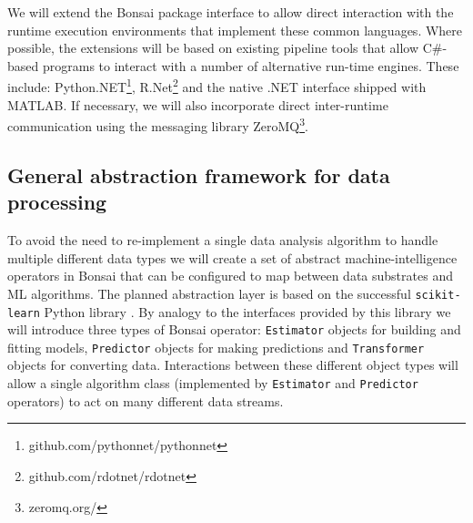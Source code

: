 We will extend the Bonsai package interface to allow direct interaction with the runtime execution environments that implement these common languages.  
%
Where possible, the extensions will be based on existing pipeline tools that allow C\#-based programs to interact with a number of alternative run-time engines.
%
These include:
%
Python.NET\footnote{github.com/pythonnet/pythonnet},
%
R.Net\break \footnote{github.com/rdotnet/rdotnet}
%
and the native .NET interface shipped with MATLAB.
%
If necessary, we will also incorporate direct inter-runtime communication using the messaging library ZeroMQ\footnote{zeromq.org/}.\\

\subsection{General abstraction framework for data processing}
\label{sec:generality}

To avoid the need to re-implement a single data analysis algorithm to handle multiple different data types we will create a set of abstract machine-intelligence operators in Bonsai that can be configured to map between data substrates and ML algorithms.
%
The planned abstraction layer is based on the successful \texttt{scikit-learn} Python
library \citep{buitinckEtAl13}.
%
By analogy to the interfaces provided by this library we will introduce three types of Bonsai operator: \texttt{Estimator} objects for building and fitting models, \texttt{Predictor} objects for making predictions and \texttt{Transformer} objects for converting data.
%
Interactions between these different object types will allow a single algorithm class (implemented by \texttt{Estimator} and \texttt{Predictor} operators) to act on many different data streams.
%






